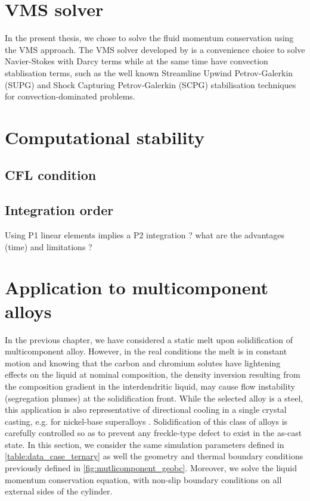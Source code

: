 \section{VMS solver}
In the present thesis, we chose to solve the fluid momentum conservation using the VMS approach. The VMS solver developed 
by \citet{hachem_stabilized_2010} is a convenience choice to solve Navier-Stokes with Darcy terms while at the same time 
have convection stablisation terms, such as the well known Streamline Upwind Petrov-Galerkin (SUPG) and Shock Capturing Petrov-Galerkin (SCPG)
stabilisation techniques for convection-dominated problems.


\section{Computational stability}
\subsection{CFL condition}
\subsection{Integration order}
Using P1 linear elements implies a P2 integration ? what are the advantages (time) and limitations ?

\section{Application to multicomponent alloys}
In the previous chapter, we have considered a static melt upon solidification of multicomponent alloy. However, in the real conditions the melt is in constant motion 
and knowing that the carbon and chromium solutes have lightening effects on the liquid 
at nominal composition, the density inversion resulting from the composition gradient in the interdendritic 
liquid, may cause flow instability (segregation plumes) at the solidification front. While the selected alloy 
is a steel, this application is also representative of directional cooling in a single crystal casting, e.g. 
for nickel-base superalloys \citep{beckermann_development_2000}. Solidification of this class of alloys is carefully
controlled so as to prevent any freckle-type defect to exist in the as-cast state.
In this section, we consider the same simulation parameters defined in \cref{table:data_case_ternary} as well the geometry and thermal boundary conditions
previously defined in \cref{fig:mutlicomponent_geobc}. Moreover, we solve the liquid momentum conservation equation, with non-slip boundary conditions
on all external sides of the cylinder.

